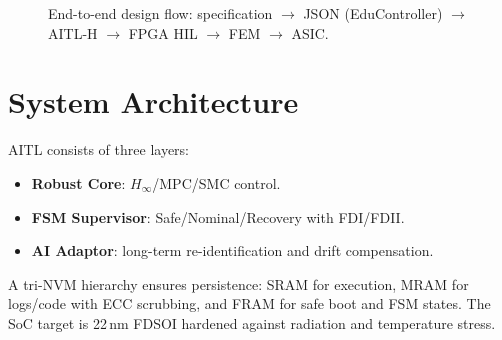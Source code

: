 \documentclass[conference]{IEEEtran}
\begin{document}
\begin{figure}[t]
\centering
{}
\caption{End-to-end design flow: specification $\rightarrow$ JSON (EduController) $\rightarrow$ AITL-H $\rightarrow$ FPGA HIL $\rightarrow$ FEM $\rightarrow$ ASIC.}
\label{fig:flow}
\end{figure}

\section{System Architecture}
AITL consists of three layers:
\begin{itemize}
  \item \textbf{Robust Core}: $H_\infty$/MPC/SMC control.
  \item \textbf{FSM Supervisor}: Safe/Nominal/Recovery with FDI/FDII.
  \item \textbf{AI Adaptor}: long-term re-identification and drift compensation.
\end{itemize}
A tri-NVM hierarchy ensures persistence: SRAM for execution, MRAM for logs/code with ECC scrubbing, and FRAM for safe boot and FSM states. The SoC target is 22\,nm FD\!SOI hardened against radiation and temperature stress.
\end{document}
